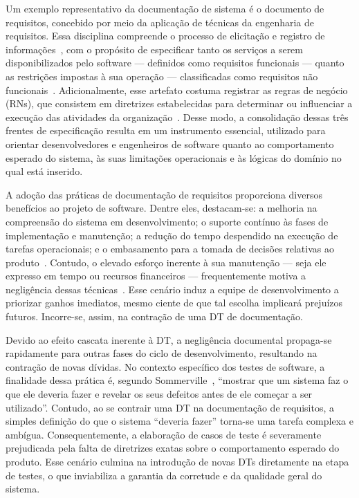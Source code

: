 Um exemplo representativo da documentação de sistema é o documento de requisitos, concebido por meio da aplicação de técnicas da engenharia de requisitos. Essa disciplina compreende o processo de elicitação e registro de informações~\cite{20}, com o propósito de especificar tanto os serviços a serem disponibilizados pelo software --- definidos como requisitos funcionais --- quanto as restrições impostas à sua operação --- classificadas como requisitos não funcionais~\cite{8}. Adicionalmente, esse artefato costuma registrar as regras de negócio (RNs), que consistem em diretrizes estabelecidas para determinar ou influenciar a execução das atividades da organização~\cite{23}. Desse modo, a consolidação dessas três frentes de especificação resulta em um instrumento essencial, utilizado para orientar desenvolvedores e engenheiros de software quanto ao comportamento esperado do sistema, às suas limitações operacionais e às lógicas do domínio no qual está inserido.

A adoção das práticas de documentação de requisitos proporciona diversos benefícios ao projeto de software. Dentre eles, destacam-se: a melhoria na compreensão do sistema em desenvolvimento; o suporte contínuo às fases de implementação e manutenção; a redução do tempo despendido na execução de tarefas operacionais; e o embasamento para a tomada de decisões relativas ao produto~\cite{3}. Contudo, o elevado esforço inerente à sua manutenção --- seja ele expresso em tempo ou recursos financeiros --- frequentemente motiva a negligência dessas técnicas~\cite{3, 2}. Esse cenário induz a equipe de desenvolvimento a priorizar ganhos imediatos, mesmo ciente de que tal escolha implicará prejuízos futuros. Incorre-se, assim, na contração de uma DT de documentação.

Devido ao efeito cascata inerente à DT, a negligência documental propaga-se rapidamente para outras fases do ciclo de desenvolvimento, resultando na contração de novas dívidas. No contexto específico dos testes de software, a finalidade dessa prática é, segundo Sommerville~\cite[p. 227, tradução nossa]{8}, ``mostrar que um sistema faz o que ele deveria fazer e revelar os seus defeitos antes de ele começar a ser utilizado''. Contudo, ao se contrair uma DT na documentação de requisitos, a simples definição do que o sistema ``deveria fazer'' torna-se uma tarefa complexa e ambígua. Consequentemente, a elaboração de casos de teste é severamente prejudicada pela falta de diretrizes exatas sobre o comportamento esperado do produto. Esse cenário culmina na introdução de novas DTs diretamente na etapa de testes, o que inviabiliza a garantia da corretude e da qualidade geral do sistema.

